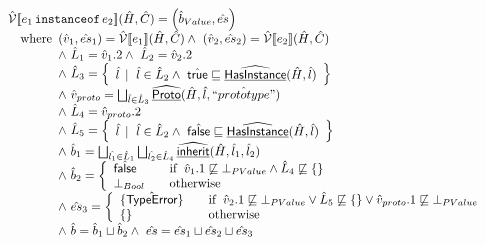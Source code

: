 \[
\begin{array}{ll}
\aV\lbr e_1\,\TT{instanceof}\,e_2\rbr (\hat{H},\hat{C})
 = \left(\hat{b}_{Value},\hat{es}\right)\\
\quad\wherec{
  (\hat{v}_1,\hat{es}_1) = \aV\lbr e_1\rbr(\hat{H},\hat{C})
  \land\ (\hat{v}_2,\hat{es}_2) = \aV\lbr e_2\rbr(\hat{H},\hat{C})\\
  \land\ \hat{L}_1 = \hat{v}_1.2
  \land\ \hat{L}_2 = \hat{v}_2.2\\
  \land\ \hat{L}_3 = \set{ \hat{l} \,\mid\ \hat{l}\in\hat{L}_2\land\ \atrue\sqsubseteq\ahf{HasInstance}(\hat{H},\hat{l}) } \\
  \land\ \hat{v}_{proto} = \bigsqcup_{\hat{l}\in\hat{L}_3} \ahf{Proto}(\hat{H},\hat{l},\hat{``prototype"}) \\
  \land\ \hat{L}_4 = \hat{v}_{proto}.2 \\
  \land\ \hat{L}_5 = \set{ \hat{l} \,\mid\ \hat{l}\in\hat{L}_2\land\ \afalse\sqsubseteq\ahf{HasInstance}(\hat{H},\hat{l}) } \\
  \land\ \hat{b}_1 = \bigsqcup_{\hat{l_1}\in\hat{L}_1}\bigsqcup_{\hat{l_2}\in\hat{L}_4}\ahf{inherit}(\hat{H},\hat{l}_1,\hat{l}_2) \\
  \land\ \hat{b}_2 = \left\{
    \begin{array}{ll}
      \afalse & \quad\ifc{\hat{v}_1.1\not\sqsubseteq \bot_{PValue} \land \hat{L}_4\not\sqsubseteq \{\}} \\
      \bot_{Bool} & \quad\owc \\
    \end{array}
  \right.\\
  \land\ \hat{es}_3 = \left\{
    \begin{array}{ll}
      \{\hat{\exc{TypeError}}\} & \quad\ifc{\hat{v}_2.1\not\sqsubseteq \bot_{PValue}\lor \hat{L}_5\not\sqsubseteq\{\}\lor\hat{v}_{proto}.1\not\sqsubseteq \bot_{PValue}} \\
      \{\} & \quad\owc \\
    \end{array}
  \right.\\
  \land\ \hat{b} = \hat{b}_1 \sqcup \hat{b}_2 \land\ \hat{es} = \hat{es}_1 \sqcup \hat{es}_2 \sqcup \hat{es}_3
}
\\\\


\end{array}\]
